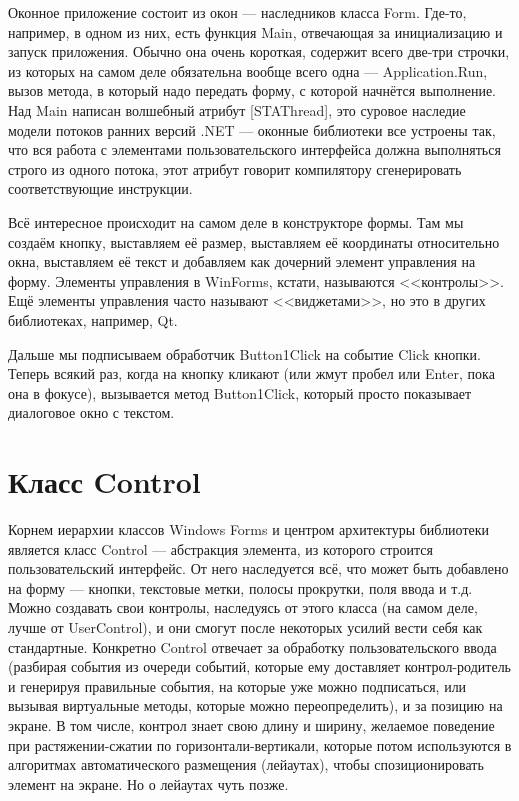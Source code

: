 \documentclass{../../text-style}
\begin{document}
Оконное приложение состоит из окон --- наследников класса Form. Где-то, например, в одном из них, есть функция Main, отвечающая за инициализацию и запуск приложения. Обычно она очень короткая, содержит всего две-три строчки, из которых на самом деле обязательна вообще всего одна --- Application.Run, вызов метода, в который надо передать форму, с которой начнётся выполнение. Над Main написан волшебный атрибут [STAThread], это суровое наследие модели потоков ранних версий .NET --- оконные библиотеки все устроены так, что вся работа с элементами пользовательского интерфейса должна выполняться строго из одного потока, этот атрибут говорит компилятору сгенерировать соответствующие инструкции.

Всё интересное происходит на самом деле в конструкторе формы. Там мы создаём кнопку, выставляем её размер, выставляем её координаты относительно окна, выставляем её текст и добавляем как дочерний элемент управления на форму. Элементы управления в WinForms, кстати, называются <<контролы>>. Ещё элементы управления часто называют <<виджетами>>, но это в других библиотеках, например, Qt. 

Дальше мы подписываем обработчик Button1Click на событие Click кнопки. Теперь всякий раз, когда на кнопку кликают (или жмут пробел или Enter, пока она в фокусе), вызывается метод Button1Click, который просто показывает диалоговое окно с текстом.

\section{Класс Control}

Корнем  иерархии классов Windows Forms и центром архитектуры библиотеки является класс Control --- абстракция элемента, из которого строится пользовательский интерфейс. От него наследуется всё, что может быть добавлено на форму --- кнопки, текстовые метки, полосы прокрутки, поля ввода и т.д. Можно создавать свои контролы, наследуясь от этого класса (на самом деле, лучше от UserControl), и они смогут после некоторых усилий вести себя как стандартные. Конкретно Control отвечает за обработку пользовательского ввода (разбирая события из очереди событий, которые ему доставляет контрол-родитель и генерируя правильные события, на которые уже можно подписаться, или вызывая виртуальные методы, которые можно переопределить), и за позицию на экране. В том числе, контрол знает свою длину и ширину, желаемое поведение при растяжении-сжатии по горизонтали-вертикали, которые потом используются в алгоритмах автоматического размещения (лейаутах), чтобы спозиционировать элемент на экране. Но о лейаутах чуть позже.
\end{document}
